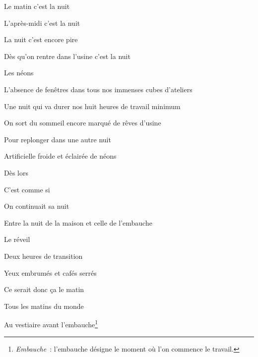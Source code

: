 
{

\setlength{\parskip}{0pt}

Le matin c'est la nuit

L'après-midi c'est la nuit

La nuit c'est encore pire

\medskip

Dès qu'on rentre dans l'usine c'est la nuit

Les néons

L'absence de fenêtres dans tous nos immenses cubes d'ateliers

Une nuit qui va durer nos huit heures de travail minimum

\medskip

On sort du sommeil encore marqué de rêves d'usine

Pour replonger dans une autre nuit

Artificielle froide et éclairée de néons

\medskip

Dès lors

C'est comme si

On continuait sa nuit

\medskip

Entre la nuit de la maison et celle de l'embauche

Le réveil

Deux heures de transition

Yeux embrumés et cafés serrés

Ce serait donc ça le matin

Tous les matins du monde

\medskip

Au vestiaire avant l'embauche\footnote{\emph{Embauche}~: l'embauche désigne le moment où l'on commence le travail.}

}
